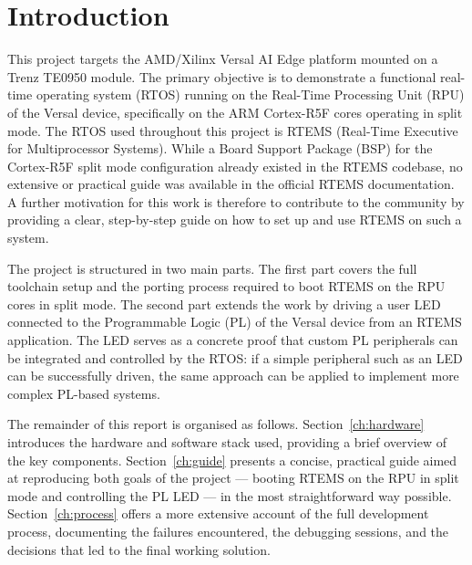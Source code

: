 \documentclass[
	a4paper,
]{CSMakotoTechnicalReport}
\begin{document}
\newpage


\section{Introduction}
\label{ch:introduction}

This project targets the AMD/Xilinx Versal AI Edge platform mounted on a Trenz TE0950 module.
The primary objective is to demonstrate a functional real-time operating system (RTOS) running on the Real-Time Processing Unit (RPU) of the Versal device, specifically on the ARM Cortex-R5F cores operating in split mode.
The RTOS used throughout this project is RTEMS (Real-Time Executive for Multiprocessor Systems).
While a Board Support Package (BSP) for the Cortex-R5F split mode configuration already existed in the RTEMS codebase, no extensive or practical guide was available in the official RTEMS documentation.
A further motivation for this work is therefore to contribute to the community by providing a clear, step-by-step guide on how to set up and use RTEMS on such a system.

The project is structured in two main parts.
The first part covers the full toolchain setup and the porting process required to boot RTEMS on the RPU cores in split mode.
The second part extends the work by driving a user LED connected to the Programmable Logic (PL) of the Versal device from an RTEMS application.
The LED serves as a concrete proof that custom PL peripherals can be integrated and controlled by the RTOS: if a simple peripheral such as an LED can be successfully driven, the same approach can be applied to implement more complex PL-based systems.

The remainder of this report is organised as follows.
Section~\ref{ch:hardware} introduces the hardware and software stack used, providing a brief overview of the key components.
Section~\ref{ch:guide} presents a concise, practical guide aimed at reproducing both goals of the project --- booting RTEMS on the RPU in split mode and controlling the PL LED --- in the most straightforward way possible.
Section~\ref{ch:process} offers a more extensive account of the full development process, documenting the failures encountered, the debugging sessions, and the decisions that led to the final working solution.
\end{document}
